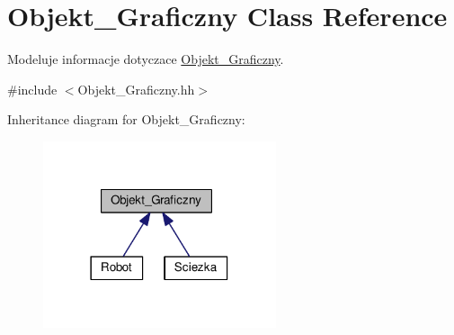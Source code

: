 \hypertarget{class_objekt___graficzny}{\section{Objekt\+\_\+\+Graficzny Class Reference}
\label{class_objekt___graficzny}
}


Modeluje informacje dotyczace \hyperlink{class_objekt___graficzny}{Objekt\+\_\+\+Graficzny}.  




{\ttfamily \#include $<$Objekt\+\_\+\+Graficzny.\+hh$>$}



Inheritance diagram for Objekt\+\_\+\+Graficzny\+:\nopagebreak
\begin{figure}[H]
\begin{center}
\leavevmode
\includegraphics[width=194pt]{class_objekt___graficzny__inherit__graph}
\end{center}
\end{figure}
